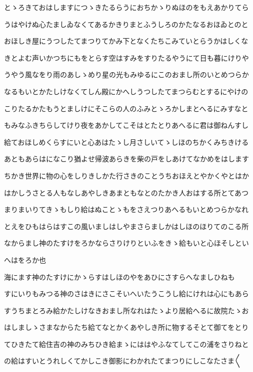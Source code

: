 \documentclass[a4paper,11pt,landscape]{ltjtarticle}
\begin{document}
とゝろきておはしますにつゝきたるらうにおちかゝりぬほのをもえあかりてら
\par\medskip
うはやけぬ心たましゐなくてあるかきりまとふうしろのかたなるおほゐとのと
\par\medskip
おほしき屋にうつしたてまつりてかみ下となくたちこみていとらうかはしくな
\par\medskip
きとよむ声いかつちにもをとらす空はすみをすりたるやうにて日も暮にけりや
\par\medskip
うやう風なをり雨のあしゝめり星の光もみゆるにこのおまし所のいとめつらか
\par\medskip
なるもいとかたしけなくてしん殿にかへしうつしたてまつらむとするにやけの
\par\medskip
こりたるかたもうとましけにそこらの人のふみとゝろかしまとへるにみすなと
\par\medskip
もみなふきちらしてけり夜をあかしてこそはとたとりあへるに君は御ねんすし
\par\medskip
給ておほしめくらすにいと心あはたゝし月さしいてゝしほのちかくみちきける
\par\medskip
あともあらはになこり猶よせ帰波あらきを柴の戸をしあけてなかめをはします
\par\medskip
ちかき世界に物の心をしりきしかた行さきのことうちおほえとやかくやとはか
\par\medskip
はかしうさとる人もなしあやしきあまともなとのたかき人おはする所とてあつ
\par\medskip
まりまいりてきゝもしり給はぬことゝもをさえつりあへるもいとめつらかなれ
\par\medskip
とえをひもはらはすこの風いましはしやまさらましかはしほのほりてのこる所
\par\medskip
なからまし神のたすけをろかならさりけりといふをきゝ給もいと心ほそしとい
\par\medskip
へはをろか也
\par\medskip
海にます神のたすけにかゝらすはしほのやをあひにさすらへなましひねも
\par\medskip
すにいりもみつる神のさはきにさこそいへいたうこうし給にけれは心にもあら
\par\medskip
すうちまとろみ給かたしけなきおまし所なれはたゝより居給へるに故院たゝお
\par\medskip
はしましゝさまなからたち給てなとかくあやしき所に物するそとて御てをとり
\par\medskip
てひきたて給住吉の神のみちひき給まゝにははやふなてしてこの浦をさりねと
\par\medskip
の給はすいとうれしくてかしこき御影にわかれたてまつりにしこなたさま〱
\end{document}
